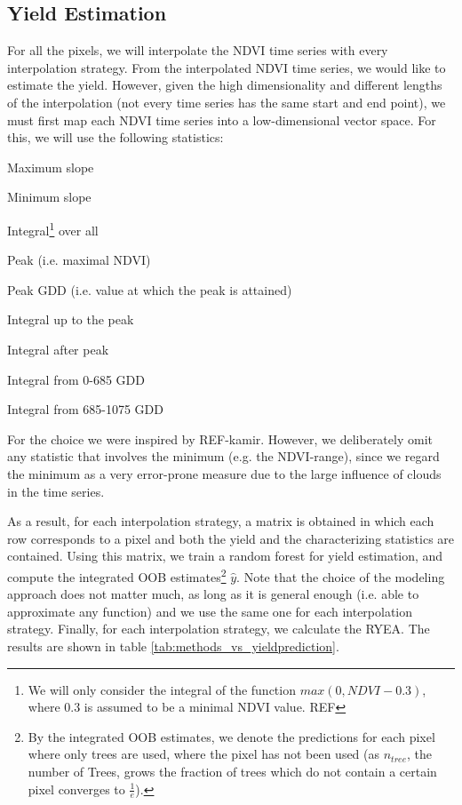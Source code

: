 {    \subsection{Yield Estimation}{
        \label{sec:corr_yield_est}
        For all the pixels, we will interpolate the NDVI time series with every interpolation strategy. From the interpolated NDVI time series, we would like to estimate the yield. However, given the high dimensionality and different lengths of the interpolation (not every time series has the same start and end point), we must first map each NDVI time series into a low-dimensional vector space. For this, we will use the following statistics:
        \begin{Nitemize}
            \item Maximum slope
            \item Minimum slope
            \item Integral\footnote{\label{note:integral-min} We will only consider the integral of the function $max(0, NDVI - 0.3)$, where $0.3$ is assumed to be a minimal NDVI value. REF} over all
            \item Peak (i.e. maximal NDVI)
            \item Peak GDD (i.e. value at which the peak is attained)
            \item Integral up to the peak
            \item Integral after peak
            \item Integral from 0-685 GDD
            \item Integral from 685-1075 GDD    
        \end{Nitemize}
        For the choice we were inspired by REF-kamir. However, we deliberately omit any statistic that involves the minimum (e.g. the NDVI-range), since we regard the minimum as a very error-prone measure due to the large influence of clouds in the time series. 
        
        As a result, for each interpolation strategy, a matrix is obtained in which each row corresponds to a pixel and both the yield and the characterizing statistics are contained.
        Using this matrix, we train a random forest for yield estimation, and compute the integrated OOB estimates\footnote{By the integrated OOB estimates, we denote the predictions for each pixel where only trees are used, where the pixel has not been used (as $n_{tree}$, the number of Trees, grows the fraction of trees which do not contain a certain pixel converges to $\frac{1}{e}$).} $\hat y$. Note that the choice of the modeling approach does not matter much, as long as it is general enough (i.e. able to approximate any function) and we use the same one for each interpolation strategy. 
        Finally, for each interpolation strategy, we calculate the RYEA. The results are shown in table \ref{tab:methods_vs_yieldprediction}.
    }

    
    
    
}



